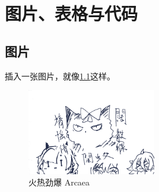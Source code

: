 \chapter{图片、表格与代码}

\section{图片}

插入一张图片，就像\cref{fig:arcaea}这样。

\begin{figure}[htbp]
    \centering
    \includegraphics[width=0.5\textwidth]{test.png}
    \caption{火热劲爆 Arcaea}
    \label{fig:arcaea}
\end{figure}
\zhlipsum[3][name=aspirin]




